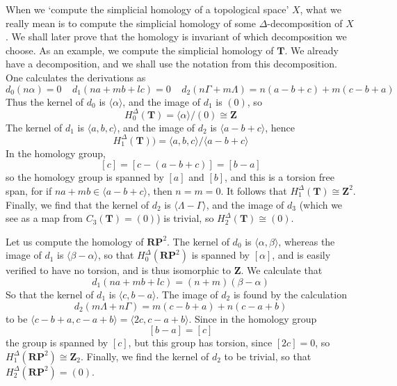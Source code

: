 \begin{example}
    When we `compute the simplicial homology of a topological space' $X$, what we really mean is to compute the simplicial homology of some $\Delta$-decomposition of $X$. We shall later prove that the homology is invariant of which decomposition we choose. As an example, we compute the simplicial homology of $\mathbf{T}$. We already have a decomposition, and we shall use the notation from this decomposition. One calculates the derivations as
    \[ d_0(n \alpha) = 0\ \ \ \ \ d_1(n a + m b + l c) = 0\ \ \ \ \ d_2(n \Gamma + m \Lambda) = n (a - b + c) + m (c - b + a) \]
    Thus the kernel of $d_0$ is $\langle \alpha \rangle$, and the image of $d_1$ is $(0)$, so
    \[ H_0^\Delta(\mathbf{T}) = \langle \alpha \rangle / (0) \cong \mathbf{Z} \]
    The kernel of $d_1$ is $\langle a, b, c \rangle$, and the image of $d_2$ is $\langle a - b + c \rangle$, hence
    \[ H_1^\Delta(\mathbf{T})) = \langle a,b,c \rangle / \langle a - b + c \rangle \]
    In the homology group,
    \[ [c] = [c - (a - b + c)] = [b - a] \]
    so the homology group is spanned by $[a]$ and $[b]$, and this is a torsion free span, for if $na + mb \in \langle a - b + c \rangle$, then $n = m = 0$. It follows that $H_1^\Delta(\mathbf{T}) \cong \mathbf{Z}^2$. Finally, we find that the kernel of $d_2$ is $\langle \Lambda - \Gamma \rangle$, and the image of $d_3$ (which we see as a map from $C_3(\mathbf{T}) = (0)$) is trivial, so $H_2^\Delta(\mathbf{T}) \cong (0)$.
\end{example}

\begin{example}
    Let us compute the homology of $\mathbf{R} \mathbf{P}^2$. The kernel of $d_0$ is $\langle \alpha, \beta \rangle$, whereas the image of $d_1$ is $\langle \beta - \alpha \rangle$, so that $H^\Delta_0(\mathbf{R}\mathbf{P}^2)$ is spanned by $[\alpha]$, and is easily verified to have no torsion, and is thus isomorphic to $\mathbf{Z}$. We calculate that
    \[ d_1(n a + m b + l c) = (n + m)(\beta - \alpha) \]
    So that the kernel of $d_1$ is $\langle c, b - a \rangle$. The image of $d_2$ is found by the calculation
    \[ d_2(m \Lambda + n \Gamma) = m(c - b + a) + n(c - a + b) \]
    to be $\langle c - b + a, c - a + b \rangle = \langle 2c, c - a + b \rangle$. Since in the homology group
    \[ [b - a] = [c] \]
    the group is spanned by $[c]$, but this group has torsion, since $[2c] = 0$, so $H_1^\Delta(\mathbf{R} \mathbf{P}^2) \cong \mathbf{Z}_2$. Finally, we find the kernel of $d_2$ to be trivial, so that $H_2^\Delta(\mathbf{R} \mathbf{P}^2) = (0)$.
\end{example}

